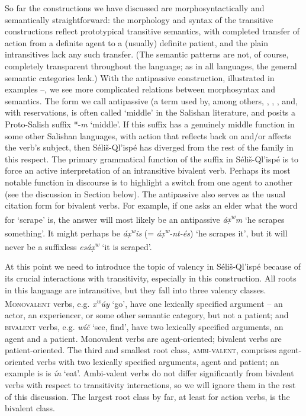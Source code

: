 \documentclass[output=paper,colorlinks,citecolor=brown]{langscibook}
\begin{document}
So far the constructions we have discussed are morphosyntactically and
semantically straightforward: the morphology and syntax of the
transitive constructions reflect prototypical transitive semantics,
with completed transfer of action from a definite agent to a (usually)
definite patient, and the plain intransitives lack any such transfer.
(The semantic patterns are not, of course, completely transparent
throughout the language; as in all languages, the general semantic
categories leak.)  With the antipassive construction, illustrated in
examples --, we see more complicated relations between morphosyntax and
semantics.  The form we call antipassive (a term used by, among
others, \citet[31]{Kroeber:1999}, \citet{Darnell:1990}, \citet{Gerdts:1993}, and,
with reservations, \citet[102]{Thompson&Thompson:1992} is often
called `middle' in the Salishan literature, and \citet[158]{Newman:1980}
posits a Proto-Salish suffix *-\emph{m} `middle'.  If this suffix has a
genuinely middle function in some other Salishan languages, with
action that reflects back on and/or affects the verb's subject, then
S\'eli\v{s}-Ql'isp\'e has diverged from the rest of the family in this
respect.  The primary grammatical function of the suffix in
S\'eli\v{s}-Ql'isp\'e is to force an active interpretation of an
intransitive bivalent verb.  Perhaps its most notable function in
discourse is to highlight a switch from one agent to another (see the
discussion in Section  below).  The antipassive also serves as the usual
citation form for bivalent verbs.  For example, if one asks an elder
what the word for `scrape' is, the answer will most likely be an
antipassive \emph{\textglotstop\'a{\d{x}\textsuperscript w}m} `he
scrapes something'.  It might perhaps be \emph{\textglotstop\'a{\d{x}\textsuperscript w}is} (= \emph{\textglotstop\'a{\d{x}\textsuperscript w}-nt-\'es}) `he scrapes it',
but it will never be a suffixless \emph{es\textglotstop\'a\d{x}\textsuperscript w} `it is scraped'.

At this point we need to introduce the topic of valency in
S\'eli\v{s}-Ql'isp\'e because of its crucial interactions with
transitivity, especially in this construction.  All roots in this
language are intransitive, but they fall into three valency
classes. \textsc{Monovalent} verbs, e.g. \emph{x\textsuperscript w\'uy}
`go', have one lexically specified argument -- an actor, an
experiencer, or some other semantic category, but not a patient; and
\textsc{bivalent} verbs, e.g. \emph{w\'i\v{c}} `see, find', have two
lexically specified arguments, an agent and a patient.  Monovalent
verbs are agent-oriented; bivalent verbs are patient-oriented.  The
third and smallest root class, \textsc{ambi-valent}, comprises\newline
agent-oriented verbs with two lexically specified arguments, agent and
patient; an example is is \emph{\textglotstop\'i{\textltilde}n} `eat'.
Ambi-valent verbs do not differ significantly from bivalent verbs with
respect to transitivity interactions, so we will ignore them in the
rest of this discussion.  The largest root class by far, at least for
action verbs, is the bivalent class.
\end{document}
